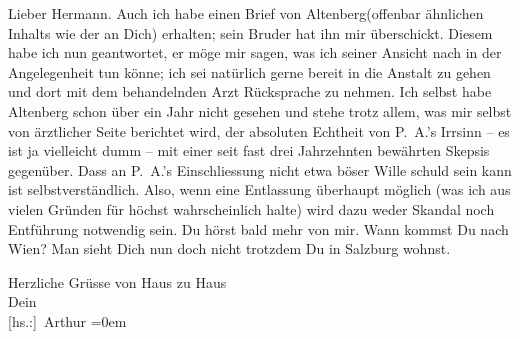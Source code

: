 \pstart{}Lieber Hermann.\pend\vspace{0.5em}
\pstart
           Auch ich habe einen Brief von Altenberg\introOben{}(\introOben{}offenbar ähnlichen Inhalts wie der an Dich\introOben{})\introOben{} erhalten; sein Bruder hat ihn mir überschickt. Diesem habe ich nun
               geantwortet, er möge mir sagen, was ich seiner Ansicht nach in der Angelegenheit tun
               könne; ich sei natürlich gerne bereit in die Anstalt zu gehen und dort mit dem
               behandelnden Arzt
               Rücksprache zu nehmen. Ich selbst habe Altenberg schon über ein Jahr nicht gesehen und stehe trotz allem, was mir
               selbst von ärztlicher Seite berichtet wird, der absoluten Echtheit von P. A.’s Irr{\pb}sinn – es ist ja
               vielleicht dumm – mit einer seit fast drei Jahrzehnten bewährten Skepsis gegenüber.
               Dass an P. A.’s Einschliessung nicht etwa böser
               Wille schuld sein kann ist selbstverständlich. Also, wenn eine Entlassung überhaupt
               möglich (was ich aus vielen Gründen für höchst wahrscheinlich halte) wird dazu weder
               Skandal noch Entführung notwendig sein. Du hörst bald mehr von mir. Wann kommst Du
               nach Wien? Man sieht Dich nun doch nicht trotzdem
               Du in Salzburg wohnst.\pend
           
\pstart
           Herzliche Grüsse von Haus zu Haus{\\[\baselineskip]}Dein{\\[\baselineskip]}\spacefill\mbox{{[}hs.:{]} Arthur}\pend
           \leftskip=0em{}\endnumbering{}  
      
